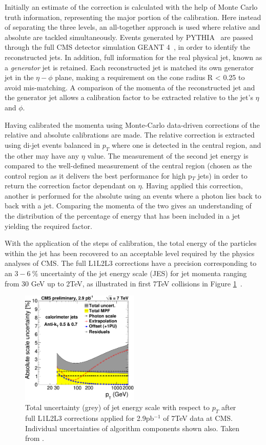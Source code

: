 Initially an estimate of the correction is calculated with the help of Monte Carlo truth information, representing the major portion of the calibration. Here instead of separating the three levels, an all-together approach is used where relative and absolute are tackled simultaneously. Events generated by \textsc{PYTHIA}~\cite{PYTHIA64} are passed through the full CMS detector simulation \textsc{GEANT 4}~\cite{GEANT4}, in order to identify the reconstructed jets. In addition, full information for the real physical jet, known as a \textit{generator} jet is retained. Each reconstructed jet is matched its own generator jet in the $\eta - \phi$ plane, making a requirement on the cone radius R < 0.25 to avoid mis-matching. A comparison of the momenta of the reconstructed jet and the generator jet allows a calibration factor to be extracted relative to the jet's $\eta$ and $\phi$. 

Having calibrated the momenta using Monte-Carlo data-driven corrections of the relative and absolute calibrations are made. The relative correction is extracted using di-jet events balanced in $p_{T}$ where one is detected in the central region, and the other may have any $\eta$ value. The measurement of the second jet energy is compared to the well-defined measurement of the central region (chosen as the control region as it delivers the best performance for high p$_{T}$ jets) in order to return the correction factor dependant on $\eta$.  Having applied this correction, another is performed for the absolute using an events where a photon lies back to back with a jet. Comparing the momenta of the two gives an understanding of the distribution of the percentage of energy that has been included in a jet yielding the required factor.

With the application of the steps of calibration, the total energy of the particles within the jet has been recovered to an acceptable level required by the physics analyses of CMS. The full L1L2L3 corrections have a precision corresponding to an $3 - 6~\%$ uncertainty of the jet energy scale (JES) for jet momenta ranging from 30 GeV up to 2TeV, as illustrated in first 7TeV collisions in Figure \ref{fig:JESU}~\cite{JME-10-010}.


\begin{figure}
\centering
\includegraphics[width=0.5\textwidth]{Figures/Objects/JESU}
\caption{\label{fig:JESU}Total uncertainty (grey) of jet energy scale with respect to $p_{T}$ after full L1L2L3 corrections applied for 2.9pb$^{-1}$ of 7TeV data at CMS. Individual uncertainties of algorithm components shown also. Taken from \cite{JME-10-010}.}
\end{figure}

